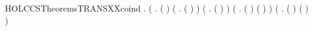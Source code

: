 \newcommand{\HOLCCSTheoremsTRANSXXcases}{\UseVerbatim{HOLCCSTheoremsTRANSXXcases}}
\begin{SaveVerbatim}{HOLCCSTheoremsTRANSXXcoind}
\HOLTokenTurnstile{} \HOLSymConst{\HOLTokenForall{}}.
       (\HOLSymConst{\HOLTokenForall{}}  .
                \HOLSymConst{\HOLTokenImp{}}
            ( \HOLSymConst{=} ) \HOLSymConst{\HOLTokenDisj{}}
            (\HOLSymConst{\HOLTokenExists{}} . ( \HOLSymConst{=}  \HOLSymConst{+} ) \HOLSymConst{\HOLTokenConj{}}    ) \HOLSymConst{\HOLTokenDisj{}}
            (\HOLSymConst{\HOLTokenExists{}} . ( \HOLSymConst{=}  \HOLSymConst{+} ) \HOLSymConst{\HOLTokenConj{}}    ) \HOLSymConst{\HOLTokenDisj{}}
            (\HOLSymConst{\HOLTokenExists{}}  .
                 ( \HOLSymConst{=}  \HOLSymConst{\ensuremath{\parallel}} ) \HOLSymConst{\HOLTokenConj{}} ( \HOLSymConst{=}  \HOLSymConst{\ensuremath{\parallel}} ) \HOLSymConst{\HOLTokenConj{}}    ) \HOLSymConst{\HOLTokenDisj{}}
            (\HOLSymConst{\HOLTokenExists{}}  .
                 ( \HOLSymConst{=}  \HOLSymConst{\ensuremath{\parallel}} ) \HOLSymConst{\HOLTokenConj{}} ( \HOLSymConst{=}  \HOLSymConst{\ensuremath{\parallel}} ) \HOLSymConst{\HOLTokenConj{}}    ) \HOLSymConst{\HOLTokenDisj{}}

\end{SaveVerbatim}
